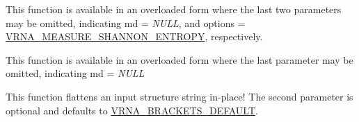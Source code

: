 \begin{DoxyRefList}
\item[\label{wrappers__wrappers000002}%
\Hypertarget{wrappers__wrappers000002}%
Global \hyperlink{group__aln__utils_gaa12b481a7e7b965ef2eb1bcc4399e759}{vrna\+\_\+aln\+\_\+conservation\+\_\+col} (const char $\ast$$\ast$alignment, const vrna\+\_\+md\+\_\+t $\ast$md\+\_\+p, unsigned int options)]This function is available in an overloaded form where the last two parameters may be omitted, indicating {\ttfamily md} = {\itshape N\+U\+LL}, and {\ttfamily options} = \hyperlink{group__aln__utils_ga1e659227c9fc077d29989f576f129000}{V\+R\+N\+A\+\_\+\+M\+E\+A\+S\+U\+R\+E\+\_\+\+S\+H\+A\+N\+N\+O\+N\+\_\+\+E\+N\+T\+R\+O\+PY}, respectively.  
\item[\label{wrappers__wrappers000001}%
\Hypertarget{wrappers__wrappers000001}%
Global \hyperlink{group__aln__utils_gab6f16a2ea93f3bfd4d089cc8d448bb16}{vrna\+\_\+aln\+\_\+conservation\+\_\+struct} (const char $\ast$$\ast$alignment, const char $\ast$structure, const vrna\+\_\+md\+\_\+t $\ast$md)]This function is available in an overloaded form where the last parameter may be omitted, indicating {\ttfamily md} = {\itshape N\+U\+LL}  
\item[\label{wrappers__wrappers000094}%
\Hypertarget{wrappers__wrappers000094}%
Global \hyperlink{group__struct__utils__dot__bracket_gae966b9f44168a4f4b39ca42ffb5f37b7}{vrna\+\_\+db\+\_\+flatten} (char $\ast$structure, unsigned int options)]This function flattens an input structure string in-\/place! The second parameter is optional and defaults to \hyperlink{group__struct__utils__dot__bracket_ga559ebf76b1b289f85309f4206e99aa1a}{V\+R\+N\+A\+\_\+\+B\+R\+A\+C\+K\+E\+T\+S\+\_\+\+D\+E\+F\+A\+U\+LT}.


\end{DoxyRefList}
